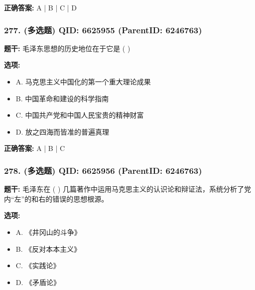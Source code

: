 \documentclass[12pt,UTF8]{ctexart}
\begin{document}
\textbf{正确答案:}
A | B | C | D

\vspace{0.3em}\hrulefill\vspace{0.7em}

\subsubsection*{277. (多选题) \small QID: 6625955 (ParentID: 6246763)}

\textbf{题干:}
毛泽东思想的历史地位在于它是 ( )



\textbf{选项:}
\begin{itemize}[leftmargin=*]

  \item A. 马克思主义中国化的第一个重大理论成果

  \item B. 中国革命和建设的科学指南

  \item C. 中国共产党和中国人民宝贵的精神财富

  \item D. 放之四海而皆准的普遍真理

\end{itemize}

\textbf{正确答案:}
A | B | C

\vspace{0.3em}\hrulefill\vspace{0.7em}

\subsubsection*{278. (多选题) \small QID: 6625956 (ParentID: 6246763)}

\textbf{题干:}
毛泽东在 ( ) 几篇著作中运用马克思主义的认识论和辩证法，系统分析了党内“左”的和右的错误的思想根源。



\textbf{选项:}
\begin{itemize}[leftmargin=*]

  \item A. 《井冈山的斗争》

  \item B. 《反对本本主义》

  \item C. 《实践论》

  \item D. 《矛盾论》

\end{itemize}
\end{document}
